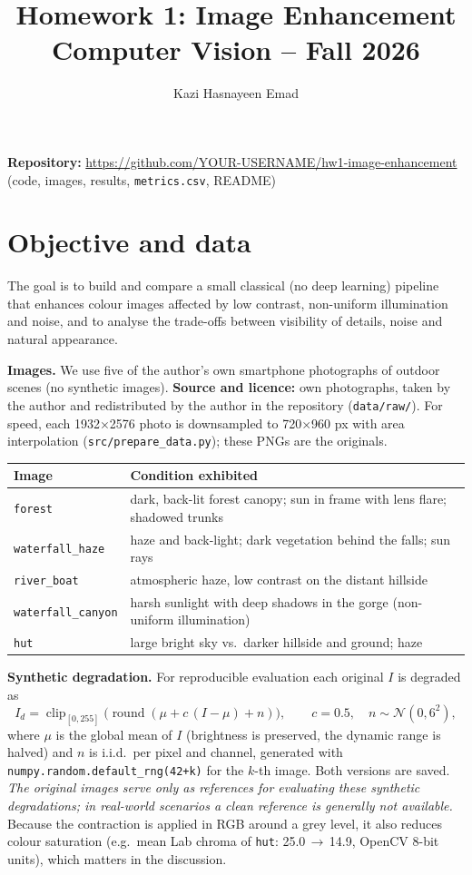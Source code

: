\documentclass[10pt,a4paper]{article}
\title{\vspace{-1.2cm}Homework 1: Image Enhancement\\[2pt]\large Computer Vision -- Fall 2026}
\author{Kazi Hasnayeen Emad}
\date{}
\begin{document}
\maketitle
\vspace{-1.0cm}

\noindent\textbf{Repository:} \url{https://github.com/YOUR-USERNAME/hw1-image-enhancement}
\hfill (code, images, results, \texttt{metrics.csv}, README)

\section{Objective and data}
The goal is to build and compare a small classical (no deep learning) pipeline that enhances colour images
affected by low contrast, non-uniform illumination and noise, and to analyse the trade-offs between
visibility of details, noise and natural appearance.

\textbf{Images.} We use five of the author's own smartphone photographs of outdoor scenes (no synthetic images).
\textbf{Source and licence:} own photographs, taken by the author and redistributed by the author in the
repository (\texttt{data/raw/}). For speed, each 1932$\times$2576 photo is downsampled to 720$\times$960 px with
area interpolation (\texttt{src/prepare\_data.py}); these PNGs are the originals.

\begin{center}\footnotesize
\begin{tabular}{@{}ll@{}}
\toprule
Image & Condition exhibited\\\midrule
\texttt{forest} & dark, back-lit forest canopy; sun in frame with lens flare; shadowed trunks\\
\texttt{waterfall\_haze} & haze and back-light; dark vegetation behind the falls; sun rays\\
\texttt{river\_boat} & atmospheric haze, low contrast on the distant hillside\\
\texttt{waterfall\_canyon} & harsh sunlight with deep shadows in the gorge (non-uniform illumination)\\
\texttt{hut} & large bright sky vs.\ darker hillside and ground; haze\\
\bottomrule
\end{tabular}
\end{center}

\textbf{Synthetic degradation.} For reproducible evaluation each original $I$ is degraded as
\[
I_d=\operatorname{clip}_{[0,255]}\!\big(\operatorname{round}(\mu + c\,(I-\mu) + n)\big),\qquad c=0.5,\quad n\sim\mathcal N(0,6^2),
\]
where $\mu$ is the global mean of $I$ (brightness is preserved, the dynamic range is halved) and $n$ is i.i.d.\ per
pixel and channel, generated with \texttt{numpy.random.default\_rng(42+k)} for the $k$-th image. Both versions are
saved. \emph{The original images serve only as references for evaluating these synthetic degradations; in
real-world scenarios a clean reference is generally not available.} Because the contraction is applied in RGB
around a grey level, it also reduces colour saturation (e.g.\ mean Lab chroma of \texttt{hut}: 25.0\,$\rightarrow$\,14.9,
OpenCV 8-bit units), which matters in the discussion.
\end{document}
